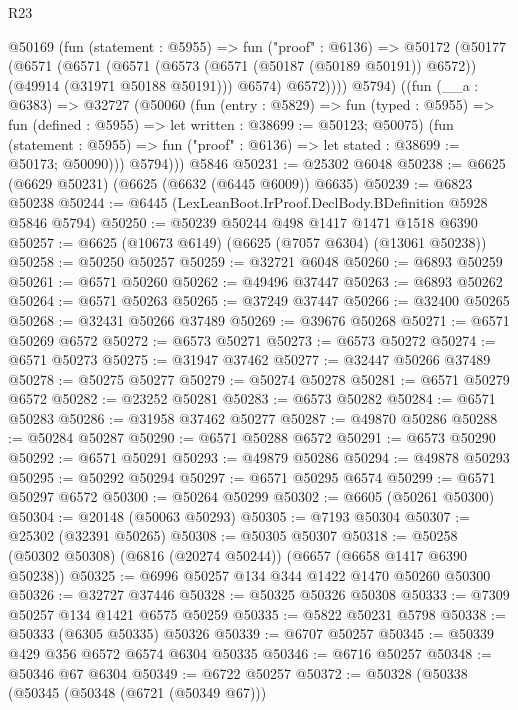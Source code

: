 \begin{lexlean}{R23}
\begin{coremodule}
        @50169
          (fun (statement : @5955) =>
          fun ("proof" : @6136) =>
          @50172
            (@50177
              (@6571
                (@6571
                  (@6571
                    (@6573 (@6571 (@50187 (@50189 @50191)) @6572))
                    (@49914 (@31971 @50188 @50191)))
                  @6574)
                @6572))))
          @5794)
        ((fun (__a : @6383) =>
        @32727
          (@50060
            (fun (entry : @5829) =>
            fun (typed : @5955) => fun (defined : @5955) => let written : @38699 := @50123; @50075)
            (fun (statement : @5955) =>
            fun ("proof" : @6136) => let stated : @38699 := @50173; @50090)))
          @5794)))
    @5846
@50231 := @25302 @6048
@50238 := @6625 (@6629 @50231) (@6625 (@6632 (@6445 @6009)) @6635)
@50239 := @6823 @50238
@50244 := @6445 (LexLeanBoot.IrProof.DeclBody.BDefinition @5928 @5846 @5794)
@50250 := @50239 @50244 @498 @1417 @1471 @1518 @6390
@50257 := @6625 (@10673 @6149) (@6625 (@7057 @6304) (@13061 @50238))
@50258 := @50250 @50257
@50259 := @32721 @6048
@50260 := @6893 @50259
@50261 := @6571 @50260
@50262 := @49496 @37447
@50263 := @6893 @50262
@50264 := @6571 @50263
@50265 := @37249 @37447
@50266 := @32400 @50265
@50268 := @32431 @50266 @37489
@50269 := @39676 @50268
@50271 := @6571 @50269 @6572
@50272 := @6573 @50271
@50273 := @6573 @50272
@50274 := @6571 @50273
@50275 := @31947 @37462
@50277 := @32447 @50266 @37489
@50278 := @50275 @50277
@50279 := @50274 @50278
@50281 := @6571 @50279 @6572
@50282 := @23252 @50281
@50283 := @6573 @50282
@50284 := @6571 @50283
@50286 := @31958 @37462 @50277
@50287 := @49870 @50286
@50288 := @50284 @50287
@50290 := @6571 @50288 @6572
@50291 := @6573 @50290
@50292 := @6571 @50291
@50293 := @49879 @50286
@50294 := @49878 @50293
@50295 := @50292 @50294
@50297 := @6571 @50295 @6574
@50299 := @6571 @50297 @6572
@50300 := @50264 @50299
@50302 := @6605 (@50261 @50300)
@50304 := @20148 (@50063 @50293)
@50305 := @7193 @50304
@50307 := @25302 (@32391 @50265)
@50308 := @50305 @50307
@50318 := @50258 (@50302 @50308) (@6816 (@20274 @50244)) (@6657 (@6658 @1417 @6390 @50238))
@50325 := @6996 @50257 @134 @344 @1422 @1470 @50260 @50300
@50326 := @32727 @37446
@50328 := @50325 @50326 @50308
@50333 := @7309 @50257 @134 @1421 @6575 @50259
@50335 := @5822 @50231 @5798
@50338 := @50333 (@6305 @50335) @50326
@50339 := @6707 @50257
@50345 := @50339 @429 @356 @6572 @6574 @6304 @50335
@50346 := @6716 @50257
@50348 := @50346 @67 @6304
@50349 := @6722 @50257
@50372 := @50328
    (@50338
      (@50345
        (@50348 (@6721 (@50349 @67)))

\end{coremodule}
\end{lexlean}
